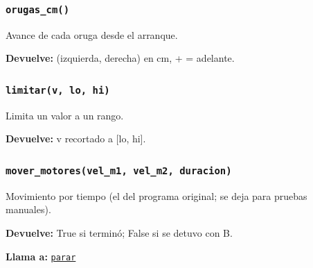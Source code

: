 \subsubsection{\texttt{orugas\_\allowbreak{}cm()}}\label{fn:funciones_rover:orugas-cm}
\noindent Avance de cada oruga desde el arranque.

\noindent\textbf{Devuelve:} (izquierda, derecha) en cm, + = adelante.\par

\subsubsection{\texttt{limitar(v, lo, hi)}}\label{fn:funciones_rover:limitar}
\noindent Limita un valor a un rango.

\par{}\par\smallskip
\noindent\textbf{Devuelve:} v recortado a [lo, hi].\par

\subsubsection{\texttt{mover\_\allowbreak{}motores(vel\_\allowbreak{}m1, vel\_\allowbreak{}m2, duracion)}}\label{fn:funciones_rover:mover-motores}
\noindent Movimiento por tiempo (el del programa original; se deja para pruebas manuales).

\par{}\par\smallskip
\noindent\textbf{Devuelve:} True si terminó; False si se detuvo con B.\par
\noindent\textbf{Llama a:} \hyperref[fn:funciones_rover:parar]{\texttt{parar}}\par

